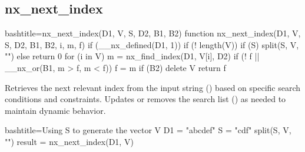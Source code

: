 \newpage
\subsection{nx_next_index}
\label{nx_next_index}
\begin{NexCodeBox}{bash}{title={nx_next_index(D1, V, S, D2, B1, B2)}}
function nx_next_index(D1, V, S, D2, B1, B2, i, m, f) {
	if (__nx_defined(D1, 1)) {
		if (! length(V)) {
			if (S)
				split(S, V, "")
			else
				return 0
		}
		for (i in V) {
			m = nx_find_index(D1, V[i], D2)
			if (! f || __nx_or(B1, m > f, m < f))
				f = m
		}
		if (B2)
			delete V
		return f
	}
}
\end{NexCodeBox}

\begin{NexMainBox}
	\begin{NexMainBox}
		Retrieves the next relevant index from the input string () based on specific search conditions and constraints. Updates or removes the search list () as needed to maintain dynamic behavior.
	\end{NexMainBox}
	\begin{NexMainBox}
		\begin{NexListDark}
		\end{NexListDark}
	\end{NexMainBox}
\end{NexMainBox}

\begin{NexCodeBox}{bash}{title={Using S to generate the vector V}}
	D1 = "abcdef"
	S = "cdf"
	split(S, V, "")
	result = nx_next_index(D1, V)
\end{NexCodeBox}


